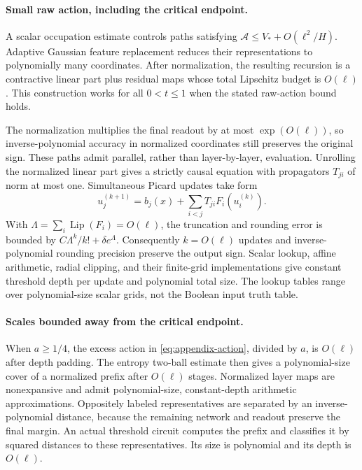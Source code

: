 \documentclass[11pt]{article}
\theoremstyle{remark}\newtheorem{remark}[theorem]{Remark}
\begin{document}
\paragraph{Small raw action, including the critical endpoint.}
A scalar occupation estimate controls paths satisfying
$\mathcal A\le V_*+O(\ell^2/H)$. Adaptive Gaussian feature replacement
reduces their representations to polynomially many coordinates. After
normalization, the resulting recursion is a contractive linear part plus
residual maps whose total Lipschitz budget is $O(\ell)$. This construction
works for all $0<t\le1$ when the stated raw-action bound holds.

The normalization multiplies the final readout by at most
$\exp(O(\ell))$, so inverse-polynomial accuracy in normalized coordinates
still preserves the original sign. These paths admit parallel, rather
than layer-by-layer, evaluation. Unrolling the normalized linear part
gives a strictly causal equation with
propagators $T_{ji}$ of norm at most one. Simultaneous Picard updates take
form
\[
 u^{(k+1)}_j=b_j(x)+\sum_{i<j}T_{ji}F_i(u^{(k)}_i).
\]
With $\Lambda=\sum_i\operatorname{Lip}(F_i)=O(\ell)$, the truncation and
rounding error is bounded by
$C\Lambda^k/k!+\delta e^{\Lambda}$.
Consequently $k=O(\ell)$ updates and inverse-polynomial rounding precision
preserve the output sign. Scalar lookup, affine arithmetic, radial
clipping, and their finite-grid implementations give constant threshold
depth per update and polynomial total size. The lookup tables range over
polynomial-size scalar grids, not the Boolean input truth table.

\paragraph{Scales bounded away from the critical endpoint.}
When $a\ge1/4$, the excess action in \eqref{eq:appendix-action}, divided
by $a$, is $O(\ell)$ after depth padding. The entropy two-ball estimate
then gives a polynomial-size cover of a normalized prefix after
$O(\ell)$ stages. Normalized layer maps are nonexpansive and admit
polynomial-size, constant-depth arithmetic approximations. Oppositely
labeled representatives are separated by an inverse-polynomial distance,
because the remaining network and readout preserve the final margin.
An actual threshold circuit computes the prefix and classifies it by
squared distances to these representatives. Its size is polynomial and
its depth is $O(\ell)$.
\end{document}
